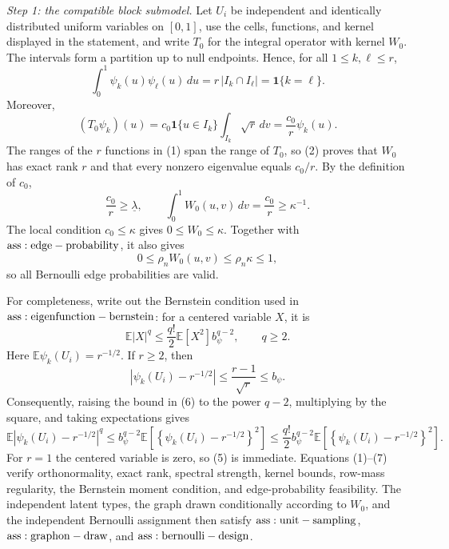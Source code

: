 \textit{Step 1: the compatible block submodel.}
Let \(U_i\) be independent and identically distributed uniform variables on \([0,1]\), use the cells, functions, and kernel displayed in the statement, and write \(T_0\) for the integral operator with kernel \(W_0\).  The intervals form a partition up to null endpoints.  Hence, for all \(1\leq k,\ell\leq r\),
\[
 \int_0^1\psi_k(u)\psi_\ell(u)\,du
 =r\,|I_k\cap I_\ell|=\mathbf 1\{k=\ell\}.
\tag{1}
\]
Moreover,
\[
 (T_0\psi_k)(u)
 =c_0\mathbf 1\{u\in I_k\}\int_{I_k}\sqrt r\,dv
 =\frac{c_0}{r}\psi_k(u).
\tag{2}
\]
The ranges of the \(r\) functions in (1) span the range of \(T_0\), so (2) proves that \(W_0\) has exact rank \(r\) and that every nonzero eigenvalue equals \(c_0/r\).  By the definition of \(c_0\),
\[
 \frac{c_0}{r}\geq\underline\lambda,
 \qquad
 \int_0^1W_0(u,v)\,dv=\frac{c_0}{r}\geq\kappa^{-1}.
\tag{3}
\]
The local condition \(c_0\leq\kappa\) gives \(0\leq W_0\leq\kappa\).  Together with \({\rm ass:edge-probability}\), it also gives
\[
 0\leq\rho_nW_0(u,v)\leq\rho_n\kappa\leq1,
\tag{4}
\]
so all Bernoulli edge probabilities are valid.

For completeness, write out the Bernstein condition used in \({\rm ass:eigenfunction-bernstein}\): for a centered variable \(X\), it is
\[
 \mathbb E|X|^q\leq\frac{q!}{2}\mathbb E[X^2]b_\psi^{q-2},
 \qquad q\geq2.
\tag{5}
\]
Here \(\mathbb E\psi_k(U_i)=r^{-1/2}\).  If \(r\geq2\), then
\[
 \left|\psi_k(U_i)-r^{-1/2}\right|
 \leq\frac{r-1}{\sqrt r}\leq b_\psi.
\tag{6}
\]
Consequently, raising the bound in (6) to the power \(q-2\), multiplying by the square, and taking expectations gives
\[
 \mathbb E\left|\psi_k(U_i)-r^{-1/2}\right|^q
 \leq b_\psi^{q-2}\mathbb E\left[\left\{\psi_k(U_i)-r^{-1/2}\right\}^2\right]
 \leq\frac{q!}{2}b_\psi^{q-2}\mathbb E\left[\left\{\psi_k(U_i)-r^{-1/2}\right\}^2\right].
\tag{7}
\]
For \(r=1\) the centered variable is zero, so (5) is immediate.  Equations (1)--(7) verify orthonormality, exact rank, spectral strength, kernel bounds, row-mass regularity, the Bernstein moment condition, and edge-probability feasibility.  The independent latent types, the graph drawn conditionally according to \(W_0\), and the independent Bernoulli assignment then satisfy \({\rm ass:unit-sampling}\), \({\rm ass:graphon-draw}\), and \({\rm ass:bernoulli-design}\).

